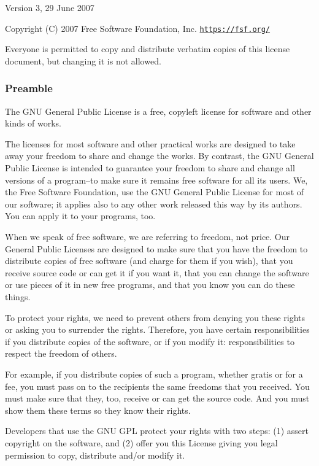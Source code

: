 Version 3, 29 June 2007

Copyright (C) 2007 Free Software Foundation, Inc. \href{https://fsf.org/}{\tt https\+://fsf.\+org/}

Everyone is permitted to copy and distribute verbatim copies of this license document, but changing it is not allowed.

\subsubsection*{Preamble}

The G\+NU General Public License is a free, copyleft license for software and other kinds of works.

The licenses for most software and other practical works are designed to take away your freedom to share and change the works. By contrast, the G\+NU General Public License is intended to guarantee your freedom to share and change all versions of a program--to make sure it remains free software for all its users. We, the Free Software Foundation, use the G\+NU General Public License for most of our software; it applies also to any other work released this way by its authors. You can apply it to your programs, too.

When we speak of free software, we are referring to freedom, not price. Our General Public Licenses are designed to make sure that you have the freedom to distribute copies of free software (and charge for them if you wish), that you receive source code or can get it if you want it, that you can change the software or use pieces of it in new free programs, and that you know you can do these things.

To protect your rights, we need to prevent others from denying you these rights or asking you to surrender the rights. Therefore, you have certain responsibilities if you distribute copies of the software, or if you modify it\+: responsibilities to respect the freedom of others.

For example, if you distribute copies of such a program, whether gratis or for a fee, you must pass on to the recipients the same freedoms that you received. You must make sure that they, too, receive or can get the source code. And you must show them these terms so they know their rights.

Developers that use the G\+NU G\+PL protect your rights with two steps\+: (1) assert copyright on the software, and (2) offer you this License giving you legal permission to copy, distribute and/or modify it.

